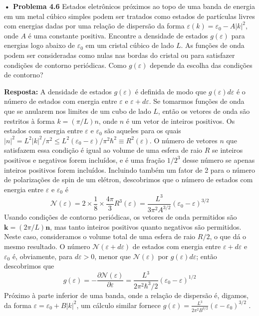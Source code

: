 \documentclass[12pt]{article}
\begin{document}
\textbf{• Problema 4.6} Estados eletrônicos próximos ao topo de uma banda de energia em um metal cúbico simples podem ser tratados como estados de partículas livres com energias dadas por uma relação de dispersão da forma $\varepsilon (k) = \varepsilon_0 - A |k|^2$, onde $A$ é uma constante positiva. Encontre a densidade de estados $g(\varepsilon)$ para energias logo abaixo de $\varepsilon_0 $ em um cristal cúbico de lado $L$. As funções de onda podem ser consideradas como nulas nas bordas do cristal ou para satisfazer condições de contorno periódicas. Como $g(\varepsilon)$  depende da escolha das condições de contorno? 

 \textbf{Resposta:} A densidade de estados $g(\varepsilon)$ é definida de modo que $g(\varepsilon)d\varepsilon$ é o número de estados com energia entre $\varepsilon$ e $\varepsilon + d\varepsilon$. Se tomarmos funções de onda que se anularem nos limites de um cubo de lado $L$, então os vetores de onda são restritos à forma $k = (\pi/L)n$, onde $n$ é um vetor de inteiros positivos. Os estados com energia entre $\varepsilon$ e $\varepsilon_0$ são aqueles para os quais $|n|^2 = L^2 |k|^2 / \pi^2 \leq L^2 (\varepsilon_0 - \varepsilon) / \pi^2 \hbar^2 \equiv R^2(\varepsilon)$. O número de vetores $n$ que satisfazem essa condição é igual ao volume de uma esfera de raio $R$ se inteiros positivos e negativos forem incluídos, e é uma fração $1/2^3$ desse número se apenas inteiros positivos forem incluídos. Incluindo também um fator de 2 para o número de polarizações de spin de um elétron, descobrimos que o número de estados com energia entre $\varepsilon$ e $\varepsilon_0$ é 
 \[
\mathcal{N}(\varepsilon) = 2 \times \frac{1}{8} \times \frac{4\pi}{3} R^3(\varepsilon) = \frac{L^3}{3 \pi^2 A^{3/2}} (\varepsilon_0 - \varepsilon)^{3/2}
\]
Usando condições de contorno periódicas, os vetores de onda permitidos são $\boldsymbol{k} = (2\pi/L)\boldsymbol{n}$, mas tanto inteiros positivos quanto negativos são permitidos. Neste caso, consideramos o volume total de uma esfera de raio $R/2$, o que dá o mesmo resultado. O número $\mathcal{N}(\varepsilon + d \varepsilon)$ de estados com energia entre $\varepsilon + d\varepsilon$ e $\varepsilon_0$ é, obviamente, para $d\varepsilon > 0$, menor que $\mathcal{N}(\varepsilon)$ por $g(\varepsilon)d\varepsilon$; então descobrimos que 
\[
g(\varepsilon) = - \frac{\partial \mathcal{N}(\varepsilon)}{\partial \varepsilon} = \frac{L^3}{2 \pi^2 \hbar^3/2} (\varepsilon_0 - \varepsilon)^{1/2}
\]
Próximo à parte inferior de uma banda, onde a relação de dispersão é, digamos, da forma $\varepsilon  = \varepsilon_0 + B|k|^2$, um cálculo similar fornece $g(\varepsilon)=\frac{L^3}{2 \pi^2 B^{3/2}} (\varepsilon - \varepsilon_0)^{3/2}$ . 

 
\end{document}

